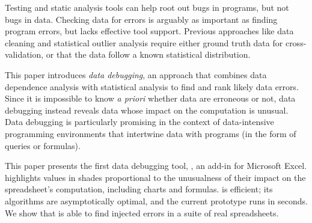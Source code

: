 Testing and static analysis tools can help root out bugs in programs,
but not bugs in data. Checking data for errors is arguably as
important as finding program errors, but lacks effective tool
support. Previous approaches like data cleaning and statistical
outlier analysis require either ground truth data for
cross-validation, or that the data follow a known statistical
distribution.

This paper introduces \emph{data debugging}, an approach that combines
data dependence analysis with statistical analysis to find and rank
likely data errors. Since it is impossible to know \emph{a priori}
whether data are erroneous or not, data debugging instead
reveals data whose impact on the computation is unusual.
Data debugging is particularly promising in the context of
data-intensive programming environments that intertwine data with
programs (in the form of queries or formulas).

This paper presents the first data debugging tool, \checkcell{}, an
add-in for Microsoft Excel. \checkcell{} highlights values in shades
proportional to the unusualness of their impact on the spreadsheet's
computation, including charts and formulas. \checkcell{} is efficient;
its algorithms are asymptotically optimal, and the current prototype
runs in seconds. We show that \checkcell{} is able to find injected
errors in a suite of real spreadsheets.

